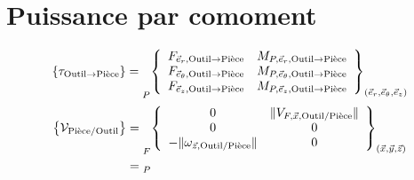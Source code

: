 \documentclass{style/presentation}
\begin{document}
\begin{frame}[plain]
    \pagemerci
\end{frame}

\appendix



\section{Puissance par comoment}
\begin{frame}
    \begin{equation*}
        \left\{\tau_{\text{Outil}\to\text{Pièce}}\right\} = \prescript{}{P}{
            \left\{
            \begin{array}{cc}
                F_{\vec{e}_r,\text{Outil}\to\text{Pièce}}      & M_{P,\vec{e}_r,\text{Outil}\to\text{Pièce}}      \\
                F_{\vec{e}_\theta,\text{Outil}\to\text{Pièce}} & M_{P,\vec{e}_\theta,\text{Outil}\to\text{Pièce}} \\
                F_{\vec{e}_z,\text{Outil}\to\text{Pièce}}      & M_{P,\vec{e}_z,\text{Outil}\to\text{Pièce}}      \\
            \end{array}
            \right\}_{(\vec{e}_r,\vec{e}_\theta,\vec{e}_z)}}
    \end{equation*}
    \begin{align*}
        \left\{\mathcal{V}_{\text{Pièce}/\text{Outil}}\right\} & = \prescript{}{F}{
            \left\{
            \begin{array}{cc}
                0                                               & \|V_{F,\vec{x},\text{Outil}/\text{Pièce}}\| \\
                0                                               & 0                                           \\
                -\|\omega_{\vec{z},\text{Outil}/\text{Pièce}}\| & 0
            \end{array}
        \right\}_{(\vec{x},\vec{y},\vec{z})}}                                       \\
                                                               & = \prescript{}{P}{
}
\end{align*}
\end{frame}
\end{document}
